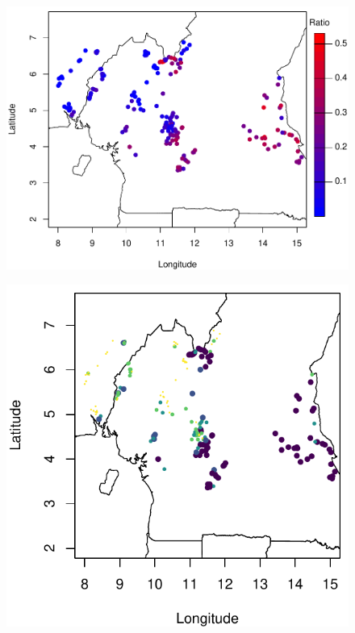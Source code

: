 \documentclass[11pt,compress,xcolor=x11names,UTF8]{beamer}
\begin{document}
\begin{frame}
\begin{figure}
\centering
\includegraphics[width=.8\textwidth]{loaloa_ratio}  
\end{figure}
\end{frame}

\begin{frame}
\begin{figure}
\centering
\includegraphics[width=.6\textwidth]{demo02} %
\end{figure}
\end{frame}
\end{document}
